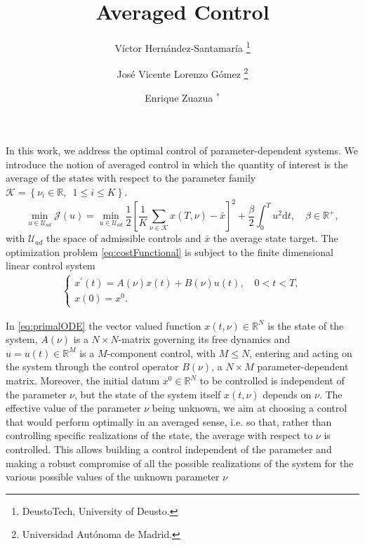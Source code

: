 \documentclass[10pt,a4paper]{article}
\begin{document}
\title{Averaged Control}
\author{Víctor Hernández-Santamaría \thanks{DeustoTech, University of Deusto.} \and José Vicente Lorenzo Gómez \thanks{Universidad Autónoma de Madrid.} \and Enrique Zuazua ${}^*$}

\maketitle

In this work, we address the optimal control of parameter-dependent systems. We introduce the notion of averaged control in which the quantity of interest is the average of the states with respect to the parameter family $\mathcal{K}= \left\{ \nu_i \in \mathbb{R}, \enspace 1\leq i \leq K \right\}$.
%
\begin{equation} \label{eq:costFunctional}
\min _{u \in \mathcal{U}_{ad}} \mathcal{J}\left( u\right) = \min _{u \in \mathcal{U}_{ad}} \frac{1}{2} \left[ \frac{1}{K} \sum_{\nu \in \mathcal{K}} x \left( T, \nu \right) - \bar{x} \right]^2  + \frac{\beta}{2} \int_0^T u^2 \mathrm{d}t, \quad \beta \in \mathbb{R}^+,
\end{equation}
%
with $\mathcal{U}_{ad}$ the space of admissible controls and $\bar{x}$ the average state target. The optimization problem \eqref{eq:costFunctional} is subject to the finite dimensional linear control system
%
\begin{align} \label{eq:primalODE}
\begin{cases}
x^\prime \left( t \right) = A \left( \nu \right) x \left( t \right) + B \left( \nu \right) u \left( t \right), \quad 0 < t <T, \\
x{\left( 0 \right)} = x^0.
\end{cases}
\end{align}

In \eqref{eq:primalODE} the vector valued function $ x \left( t, \nu \right) \in \mathbb{R}^N$ is the state of the system, $A \left( \nu \right)$ is a $N \times N$-matrix governing its free dynamics and $u=u\left( t \right) \in \mathbb{R}^M $ is a $M$-component control, with $M \leq N$, entering and acting on the system through the control operator $B\left( \nu \right)$, a $N \times M$ parameter-dependent matrix. Moreover, the initial datum $x^0 \in \mathbb{R}^N$ to be controlled is independent of the parameter $\nu$, but the state of the system itself $x \left( t, \nu \right)$ depends on $\nu$. The effective value of the parameter $\nu$ being unknown, we aim at choosing a control that would perform optimally in an averaged sense, i.e. so
that, rather than controlling specific realizations of the
state, the average with respect to $\nu$ is controlled. This
allows building a control independent of the parameter
and making a robust compromise of all the possible realizations
of the system for the various possible values
of the unknown parameter $\nu$
\end{document}
